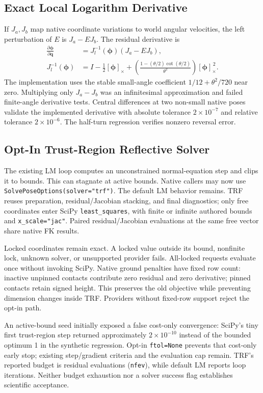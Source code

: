 \documentclass[11pt,letterpaper]{article}
\newcommand{\code}[1]{\nolinkurl{#1}}
\newcommand{\skewmat}[1]{[#1]_{\times}}
\begin{document}
\subsection{Exact Local Logarithm Derivative}
If $J_a,J_b$ map native coordinate variations to world angular velocities,
the left perturbation of $E$ is $J_a-EJ_b$. The residual derivative is
\begin{align}
 \frac{\partial\boldsymbol\phi}{\partial\mathbf q}
 &=J_l^{-1}(\boldsymbol\phi)(J_a-EJ_b),\\
 J_l^{-1}(\boldsymbol\phi)
 &=I-\tfrac12\skewmat{\boldsymbol\phi}
 +\left(\frac{1-(\theta/2)\cot(\theta/2)}{\theta^2}\right)
 \skewmat{\boldsymbol\phi}^{\,2}.
\end{align}
The implementation uses the stable small-angle coefficient
$1/12+\theta^2/720$ near zero. Multiplying only $J_a-J_b$ was an
infinitesimal approximation and failed finite-angle derivative tests.
Central differences at two non-small native poses validate the implemented
derivative with absolute tolerance $2\times10^{-7}$ and relative tolerance
$2\times10^{-6}$. The half-turn regression verifies nonzero reversal error.

\subsection{Opt-In Trust-Region Reflective Solver}
The existing LM loop computes an unconstrained normal-equation step and clips
it to bounds. This can stagnate at active bounds. Native callers may now use
\code{SolvePoseOptions(solver="trf")}. The default LM behavior remains.
TRF reuses preparation, residual/Jacobian stacking, and final diagnostics; only
free coordinates enter SciPy \code{least_squares}, with finite or infinite
authored bounds and \code{x_scale="jac"}. Paired residual/Jacobian evaluations
at the same free vector share native FK results.

Locked coordinates remain exact. A locked value outside its bound, nonfinite
lock, unknown solver, or unsupported provider fails. All-locked requests
evaluate once without invoking SciPy. Native ground penalties have fixed row
count: inactive unpinned contacts contribute zero residual and zero derivative;
pinned contacts retain signed height. This preserves the old objective while
preventing dimension changes inside TRF. Providers without fixed-row support
reject the opt-in path.

An active-bound seed initially exposed a false cost-only convergence: SciPy's
tiny first trust-region step returned approximately $2\times10^{-10}$ instead
of the bounded optimum 1 in the synthetic regression. Opt-in \code{ftol=None}
prevents that cost-only early stop; existing step/gradient criteria and the
evaluation cap remain. TRF's reported budget is residual evaluations
(\code{nfev}), while default LM reports loop iterations. Neither budget
exhaustion nor a solver success flag establishes scientific acceptance.
\end{document}
